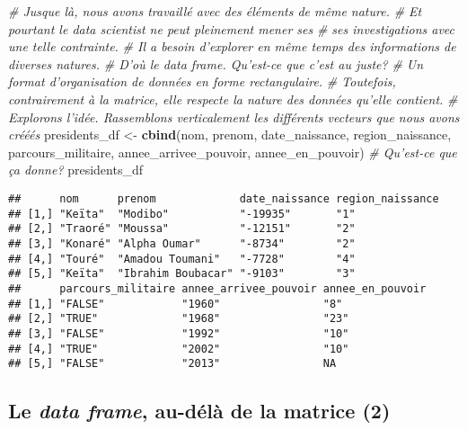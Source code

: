 \documentclass[]{book}
\newenvironment{Shaded}{\begin{snugshade}}{\end{snugshade}}
\newcommand{\KeywordTok}[1]{\textcolor[rgb]{0.13,0.29,0.53}{\textbf{#1}}}
\newcommand{\StringTok}[1]{\textcolor[rgb]{0.31,0.60,0.02}{#1}}
\newcommand{\CommentTok}[1]{\textcolor[rgb]{0.56,0.35,0.01}{\textit{#1}}}
\newcommand{\NormalTok}[1]{#1}
\begin{document}
\begin{Shaded}
\begin{Highlighting}[]
\CommentTok{# Jusque là, nous avons travaillé avec des éléments de même nature.}
\CommentTok{# Et pourtant le data scientist ne peut pleinement mener ses}
\CommentTok{# ses investigations avec une telle contrainte.}
\CommentTok{# Il a besoin d'explorer en même temps des informations de diverses natures.}
\CommentTok{# D'où le data frame. Qu'est-ce que c'est au juste?}
\CommentTok{# Un format d'organisation de données en forme rectangulaire.}
\CommentTok{# Toutefois, contrairement à la matrice, elle respecte la nature des données qu'elle contient.}
\CommentTok{# Explorons l'idée. Rassemblons verticalement les différents vecteurs que nous avons crééés}
\NormalTok{presidents_df <-}\StringTok{ }\KeywordTok{cbind}\NormalTok{(nom,}
\NormalTok{                      prenom,}
\NormalTok{                      date_naissance,}
\NormalTok{                      region_naissance,}
\NormalTok{                      parcours_militaire,}
\NormalTok{                      annee_arrivee_pouvoir,}
\NormalTok{                      annee_en_pouvoir)}
\CommentTok{# Qu'est-ce que ça donne?}
\NormalTok{presidents_df}
\end{Highlighting}
\end{Shaded}

\begin{verbatim}
##      nom      prenom             date_naissance region_naissance
## [1,] "Keïta"  "Modibo"           "-19935"       "1"             
## [2,] "Traoré" "Moussa"           "-12151"       "2"             
## [3,] "Konaré" "Alpha Oumar"      "-8734"        "2"             
## [4,] "Touré"  "Amadou Toumani"   "-7728"        "4"             
## [5,] "Keïta"  "Ibrahim Boubacar" "-9103"        "3"             
##      parcours_militaire annee_arrivee_pouvoir annee_en_pouvoir
## [1,] "FALSE"            "1960"                "8"             
## [2,] "TRUE"             "1968"                "23"            
## [3,] "FALSE"            "1992"                "10"            
## [4,] "TRUE"             "2002"                "10"            
## [5,] "FALSE"            "2013"                NA
\end{verbatim}

\normalsize

\subsection{\texorpdfstring{Le \emph{data frame}, au-délà de la matrice
(2)}{Le data frame, au-délà de la matrice (2)}}\label{le-data-frame-au-dela-de-la-matrice-2}
\end{document}
